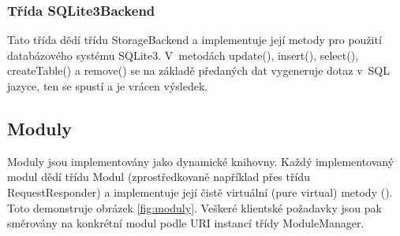 \subsubsection{Třída SQLite3Backend}

Tato třída dědí třídu StorageBackend a implementuje její metody pro použití databázového systému SQLite3. V~metodách
update(), insert(), select(), createTable() a remove() se na základě předaných
dat vygeneruje dotaz v~SQL jazyce, ten se spustí
a je vrácen výsledek.

\subsection{Moduly}
\label{implementace_moduly}

Moduly jsou implementovány jako dynamické knihovny. Každý implementovaný modul dědí třídu Modul (zprostředkovaně například přes třídu RequestResponder)
a implementuje její čistě virtuální
(pure virtual) metody (\cite{oop}). Toto demonstruje obrázek \ref{fig:moduly}. %
Veškeré klientské požadavky jsou pak směrovány na konkrétní modul podle URI instancí třídy ModuleManager.



